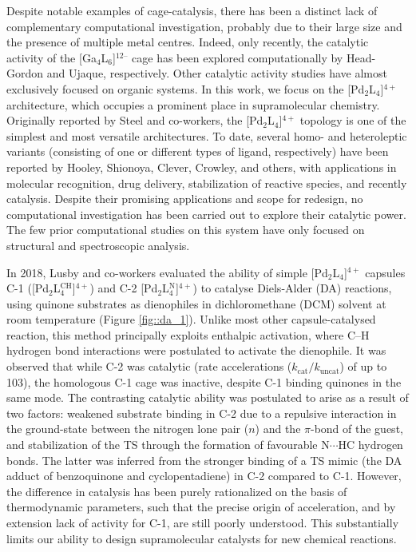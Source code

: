 \documentclass[../../main.tex]{subfiles}
\begin{document}
Despite notable examples of cage-catalysis, there has been a distinct lack of complementary computational investigation, probably due to their large size and the presence of multiple metal centres. Indeed, only recently, the catalytic activity of the [Ga$_4$L$_6$]$^{12–}$ cage has been explored computationally by Head-Gordon and Ujaque, respectively.\cite{VaissierWelborn2018, Norjmaa2019} Other catalytic activity studies have almost exclusively focused on organic systems.\cite{Pahima2019, Chakraborty2019, Goehry2015, Daver2017, Daver2018} In this work, we focus on the [Pd$_2$L$_4$]$^{4+}$ architecture, which occupies a prominent place in supramolecular chemistry.\cite{Lewis2012, Schmidt2014, Preston2016, Vasdev2017, Preston2017} Originally reported by Steel and co-workers,\cite{McMorran1998} the [Pd$_2$L$_4$]$^{4+}$ topology is one of the simplest and most versatile architectures.\cite{Schmidt2014, Vasdev2017} To date, several homo- and heteroleptic variants (consisting of one or different types of ligand, respectively) have been reported by Hooley,\cite{Liao2010} Shionoya,\cite{Clever2009} Clever,\cite{Bloch2017, Zhu2018, Li2019, Chen2019} Crowley,\cite{Lewis2013, McNeill2015} and others,\cite{Jansze2017, Chand2001, Kishi2011} with applications in molecular recognition,\cite{Kishi2011} drug delivery,\cite{Lewis2012} stabilization of reactive species,\cite{Yamashina2014} and recently catalysis.\cite{MartCentelles2018} Despite their promising applications and scope for redesign, no computational investigation has been carried out to explore their catalytic power. The few prior computational studies on this system have only focused on structural\cite{Preston2016} and spectroscopic analysis.\cite{Schmidt2016} 

In 2018, Lusby and co-workers evaluated the ability of simple [Pd$_2$L$_4$]$^{4+}$ capsules C-1 ([Pd$_2$L$^{\text{CH}}_4$]$^{4+}$) and C-2 [Pd$_2$L$^{\text{N}}_4$]$^{4+}$) to catalyse Diels-Alder (DA) reactions, using quinone substrates as dienophiles in dichloromethane (DCM) solvent at room temperature (Figure \ref{fig::da_1}).\cite{MartCentelles2018} Unlike most other capsule-catalysed reaction, this method principally exploits enthalpic activation, where C–H hydrogen bond interactions were postulated to activate the dienophile. It was observed that while C-2 was catalytic (rate accelerations ($k_\text{cat}/k_\text{uncat}$) of up to 103), the homologous C-1 cage was inactive, despite C-1 binding quinones in the same mode. The contrasting catalytic ability was postulated to arise as a result of two factors: weakened substrate binding in C-2 due to a repulsive interaction in the ground-state between the nitrogen lone pair ($n$) and the $\pi$-bond of the guest, and stabilization of the TS through the formation of favourable N$\cdots$HC hydrogen bonds. The latter was inferred from the stronger binding of a TS mimic (the DA adduct of benzoquinone and cyclopentadiene) in C-2 compared to C-1.\cite{MartCentelles2018} However, the difference in catalysis has been purely rationalized on the basis of thermodynamic parameters, such that the precise origin of acceleration, and by extension lack of activity for C-1, are still poorly understood. This substantially limits our ability to design supramolecular catalysts for new chemical reactions. 
\end{document}
